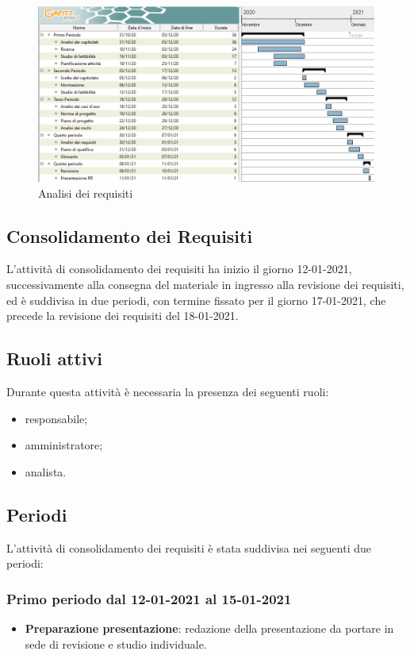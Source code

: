 \documentclass[]{article}
\begin{document}
	
	\newpage
	
	\begin{figure}[h!]
	\includegraphics[width=1.7\textwidth, left]{images/1_Analisi_dei_requisiti.png}
	\caption{Analisi dei requisiti}
	\end{figure}
	
	\newpage
	
	\subsection{Consolidamento dei Requisiti}
	L’attività di consolidamento dei requisiti ha inizio il giorno 12-01-2021, successivamente alla consegna
	del materiale in ingresso alla revisione dei requisiti, ed è suddivisa in due periodi, con termine fissato
	per il giorno 17-01-2021, che precede la revisione dei requisiti del 18-01-2021.
	
	\subsection{Ruoli attivi}
	Durante questa attività è necessaria la presenza dei seguenti ruoli:
	\begin{itemize}
	\item responsabile;
	\item amministratore;
	\item analista.
	\end{itemize}

	\subsection{Periodi}
	L’attività di consolidamento dei requisiti è stata suddivisa nei seguenti due periodi:
	
	\subsubsection{Primo periodo dal 12-01-2021 al 15-01-2021}
	\begin{itemize}
	
	\item \textbf{Preparazione presentazione}: redazione della presentazione da portare in sede di revisione e
	studio individuale.
	
	\end{itemize}	
	
\end{document}

